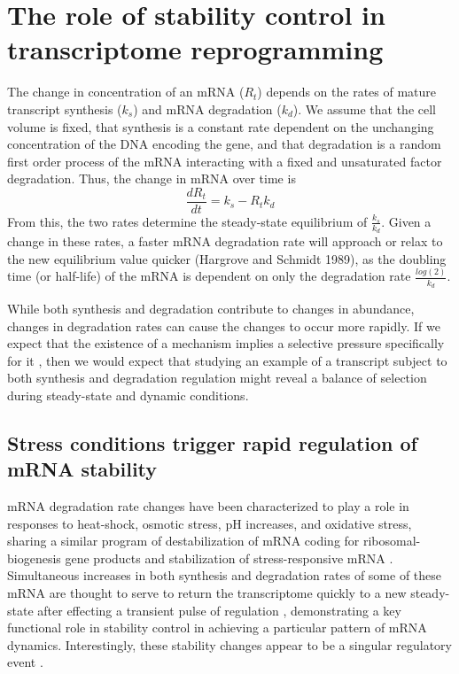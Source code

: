 \section{The role of stability control in transcriptome
reprogramming}

The change in concentration of an mRNA ($R_t$) depends
on the rates of mature transcript synthesis ($k_s$) and mRNA
degradation ($k_d$). We assume that the cell volume is fixed, that
synthesis is a constant rate dependent on the unchanging concentration
of the DNA encoding the gene, and that degradation is a random first
order process of the mRNA interacting with a fixed and unsaturated
factor degradation. Thus, the change in mRNA over time is $$
\frac{dR_t}{dt} = k_s - R_t k_d$$ From this, the two rates determine
the steady-state equilibrium of $\frac{k_s}{k_d}$. Given a change in
these rates, a faster mRNA degradation rate will approach or relax to
the new equilibrium value quicker (Hargrove and Schmidt 1989), as the
doubling time (or half-life) of the mRNA is dependent on only the
degradation rate $\frac{log(2)}{k_d}$.  

While both synthesis and
degradation contribute to changes in abundance, changes in degradation
rates can cause the changes to occur more rapidly. If we expect that
the existence of a mechanism implies a selective pressure specifically
for it 
\parencite{gould1979spandrels},
then we would expect that studying
an example of a transcript subject to both synthesis and degradation
regulation might reveal a balance of selection during steady-state and
dynamic conditions. 

\subsection{Stress conditions trigger rapid regulation of mRNA stability}

mRNA degradation rate changes have been characterized
to play a role in responses to heat-shock, osmotic stress, pH
increases, and oxidative stress, sharing a similar program of
destabilization of mRNA coding for ribosomal-biogenesis gene products
and stabilization of stress-responsive mRNA 
\parencite{canadell2015impact,molina2008comprehensive,shalem2011transcriptome,romero2009specific,molin2009mrna,castells2011heat,miller2011dynamic,garre2013nonsense}.
Simultaneous increases in both synthesis and
degradation rates of some of these mRNA are thought to serve to return
the transcriptome quickly to a new steady-state after effecting a
transient pulse of regulation 
\parencite{shalem2008transient,rabani2011metabolic},
demonstrating a key functional role in stability control in
achieving a particular pattern of mRNA dynamics. Interestingly, these
stability changes appear to be a singular regulatory event
\parencite{perez2013eukaryotic}. 

